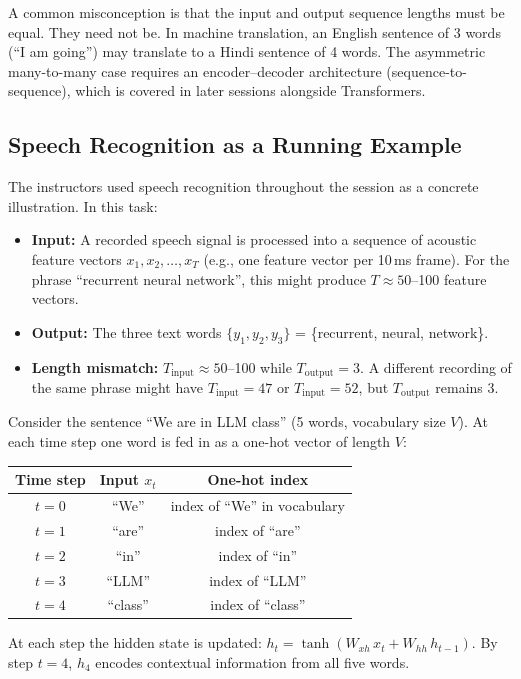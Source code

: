 \documentclass[12pt,a4paper]{article}
\newcommand{\Whh}{W_{hh}}
\newcommand{\Wxh}{W_{xh}}
\begin{document}
\begin{keyinsight}[title=Input and Output Lengths are Independent]
A common misconception is that the input and output sequence lengths must be
equal.  They need not be.  In machine translation, an English sentence of 3
words (``I am going'') may translate to a Hindi sentence of 4 words.  The
asymmetric many-to-many case requires an encoder--decoder architecture
(sequence-to-sequence), which is covered in later sessions alongside
Transformers.
\end{keyinsight}

\subsection{Speech Recognition as a Running Example}
\label{subsec:speech_example}

The instructors used speech recognition throughout the session as a concrete
illustration.  In this task:

\begin{itemize}[noitemsep]
  \item \textbf{Input:} A recorded speech signal is processed into a sequence
        of acoustic feature vectors $x_1, x_2, \ldots, x_T$ (e.g., one feature
        vector per 10\,ms frame).  For the phrase ``recurrent neural network'',
        this might produce $T \approx 50$--100 feature vectors.
  \item \textbf{Output:} The three text words $\{y_1, y_2, y_3\}$ = \{recurrent,
        neural, network\}.
  \item \textbf{Length mismatch:} $T_{\text{input}} \approx 50$--100 while
        $T_{\text{output}} = 3$.  A different recording of the same phrase
        might have $T_{\text{input}} = 47$ or $T_{\text{input}} = 52$, but
        $T_{\text{output}}$ remains 3.
\end{itemize}

\begin{example}[title=Word-by-Word Input Processing]
Consider the sentence ``We are in LLM class'' (5 words, vocabulary size $V$).
At each time step one word is fed in as a one-hot vector of length $V$:

\medskip
\begin{center}
\renewcommand{\arraystretch}{1.2}
\begin{tabular}{@{}ccc@{}}
\toprule
\textbf{Time step} & \textbf{Input $x_t$} & \textbf{One-hot index} \\
\midrule
$t=0$ & ``We''    & index of ``We'' in vocabulary \\
$t=1$ & ``are''   & index of ``are'' \\
$t=2$ & ``in''    & index of ``in'' \\
$t=3$ & ``LLM''   & index of ``LLM'' \\
$t=4$ & ``class'' & index of ``class'' \\
\bottomrule
\end{tabular}
\end{center}
\medskip
At each step the hidden state is updated:
$h_t = \tanh(\Wxh\, x_t + \Whh\, h_{t-1})$.
By step $t=4$, $h_4$ encodes contextual information from all five words.
\end{example}
\end{document}
